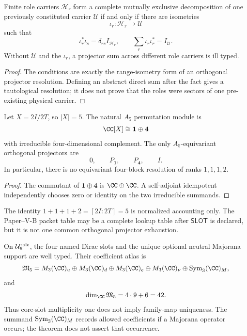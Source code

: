 \documentclass[12pt,a4paper]{article}
\newcommand{\Urole}{\mathcal U_6^{\rm role}}
\begin{document}
\begin{theorem}
\label{p6:thm:typed-exhaustion}
Finite role carriers \(\mathcal H_r\) form a complete mutually exclusive
decomposition of one previously constituted carrier \(\mathcal U\) if and
only if there are isometries
\[
\iota_r:\mathcal H_r\longrightarrow\mathcal U
\]
such that
\[
\iota_r^*\iota_s=\delta_{rs}I_{\mathcal H_r},
\qquad
\sum_r\iota_r\iota_r^*=I_{\mathcal U}.
\]
Without \(\mathcal U\) and the \(\iota_r\), a projector sum across different
role carriers is ill typed.
\end{theorem}

\begin{proof}
The conditions are exactly the range-isometry form of an orthogonal
projector resolution.  Defining an abstract direct sum after the fact gives a
tautological resolution; it does not prove that the roles were sectors of one
pre-existing physical carrier.
\end{proof}

\begin{theorem}
\label{p6:thm:rank-five-packet-obstruction}
Let \(X=2I/2T\), so \(|X|=5\).  The natural \(A_5\) permutation module is
\[
\CC[X]\cong\mathbf1\oplus\mathbf4
\]
with irreducible four-dimensional complement.  The only
\(A_5\)-equivariant orthogonal projectors are
\[
0,\qquad P_{\mathbf1},\qquad P_{\mathbf4},\qquad I.
\]
In particular, there is no equivariant four-block resolution of ranks
\(1,1,1,2\).
\end{theorem}

\begin{proof}
The commutant of \(\mathbf1\oplus\mathbf4\) is
\(\CC\oplus\CC\).  A self-adjoint idempotent independently chooses zero or
identity on the two irreducible summands.
\end{proof}

\begin{corollary}[Status of \(1+1+1+2=5\)]
\label{p6:cor:rank-five-accounting}
The identity
\(
1+1+1+2=[2I:2T]=5
\)
is normalized accounting only.  The Paper--V-B packet table may be a complete
lookup table after \(\mathsf{SLOT}\) is declared, but it is not one common
orthogonal projector exhaustion.
\end{corollary}

\begin{theorem}
\label{p6:thm:yukawa-majorana-space}
On \(\Urole\), the four named Dirac slots and the unique optional neutral
Majorana support are well typed.  Their coefficient atlas is
\[
\mathfrak M_5
=
M_3(\CC)_u\oplus M_3(\CC)_d\oplus M_3(\CC)_e
\oplus M_3(\CC)_\nu\oplus\operatorname{Sym}_3(\CC)_M,
\]
and
\[
\dim_\CC\mathfrak M_5=4\cdot9+6=42.
\]
Thus core-slot multiplicity one does not imply family-map uniqueness.  The
summand \(\operatorname{Sym}_3(\CC)_M\) records allowed coefficients if a
Majorana operator occurs; the theorem does not assert that occurrence.
\end{theorem}
\end{document}
